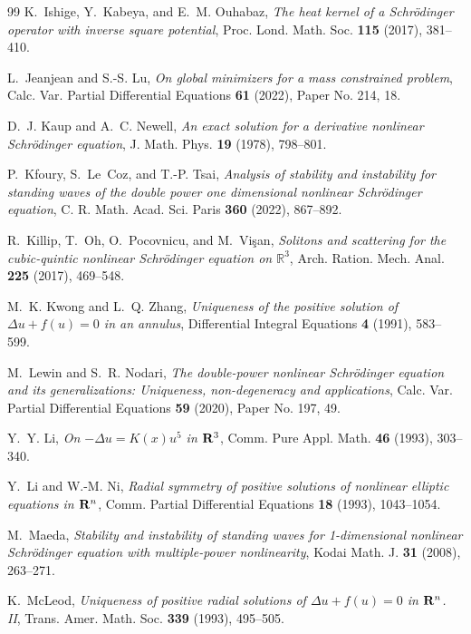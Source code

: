 \documentclass[12pt, a4paper, reqno]{amsart}
\numberwithin{equation}{section}
\theoremstyle{definition}
\theoremstyle{remark}
\begin{document}
\begin{thebibliography}{99}
K.~Ishige, Y.~Kabeya, and E.~M. Ouhabaz,
\emph{The heat kernel of a {{Schr\"odinger}} operator with inverse square
  potential},
Proc. Lond. Math. Soc. \textbf{115} (2017), 381--410.

L.~Jeanjean and S.-S. Lu,
\emph{On global minimizers for a mass constrained problem},
Calc. Var. Partial Differential Equations \textbf{61} (2022), Paper No. 214,
  18.

D.~J. Kaup and A.~C. Newell,
\emph{An exact solution for a derivative nonlinear {{Schr\"odinger}} equation},
J. Math. Phys. \textbf{19} (1978), 798--801.

P.~Kfoury, S.~Le~Coz, and T.-P. Tsai,
\emph{Analysis of stability and instability for standing waves of the double
  power one dimensional nonlinear {{Schr\"odinger}} equation},
C. R. Math. Acad. Sci. Paris \textbf{360} (2022), 867--892.

R.~Killip, T.~Oh, O.~Pocovnicu, and M.~Vi{\c s}an,
\emph{Solitons and scattering for the cubic-quintic nonlinear {S}chr\"{o}dinger
  equation on {$\mathbb{R}^3$}},
Arch. Ration. Mech. Anal. \textbf{225} (2017), 469--548.

M.~K. Kwong and L.~Q. Zhang,
\emph{Uniqueness of the positive solution of {$\Delta u+f(u)=0$} in an
  annulus},
Differential Integral Equations \textbf{4} (1991), 583--599.

M.~Lewin and S.~R. Nodari,
\emph{The double-power nonlinear {{Schr\"odinger}} equation and its
  generalizations: Uniqueness, non-degeneracy and applications},
Calc. Var. Partial Differential Equations \textbf{59} (2020), Paper No. 197,
  49.

Y.~Y. Li,
\emph{On {$-\Delta u=K(x)u^5$} in {${\bf R}^3$}},
Comm. Pure Appl. Math. \textbf{46} (1993), 303--340.

Y.~Li and W.-M. Ni,
\emph{Radial symmetry of positive solutions of nonlinear elliptic equations in
  {${\bf R}^n$}},
Comm. Partial Differential Equations \textbf{18} (1993), 1043--1054.

M.~Maeda,
\emph{Stability and instability of standing waves for 1-dimensional nonlinear
  {{Schr\"odinger}} equation with multiple-power nonlinearity},
Kodai Math. J. \textbf{31} (2008), 263--271.

K.~McLeod,
\emph{Uniqueness of positive radial solutions of {$\Delta u+f(u)=0$} in {${\bf
  R}^{n}$}. {II}},
Trans. Amer. Math. Soc. \textbf{339} (1993), 495--505.


\end{thebibliography}
\end{document}
